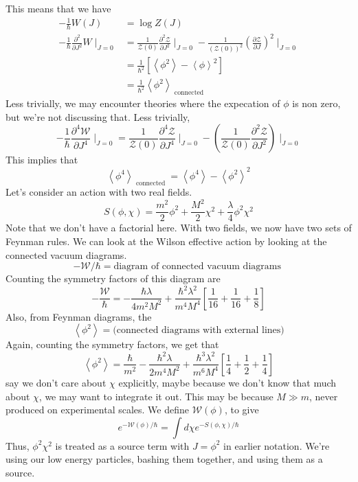 \documentclass[11pt, oneside]{article}   	%
\theoremstyle{slanted}
\begin{document}
This means that we have 
\begin{align*}
-\frac{1}{\hbar } W \left( J  \right)   &=  \log Z \left( J  \right)   \\ 
- \frac{1}{\hbar } \frac{\partial  ^ 2 }{\partial  J ^ 2 }  W \mid 
_{ J = 0 } &= \frac{1}{ \mathcal{ Z } \left( 0  \right)  } 
\frac{\partial  ^ 2 \mathcal{ Z } }{\partial  J ^ 2 }  \mid_{ J = 0 } 
- \frac{1}{\left( \mathcal{ Z } \left( 0  \right)   \right)  ^ 2 } 
\left( \frac{\partial  \mathcal{ Z } }{\partial  J }   \right)  ^ 2 \mid _{ J = 0 } \\
&=  \frac{1}{\hbar ^ 2 } \left[  
\left< \phi ^ 2  \right>  - \left< \phi  \right> ^ 2 \right]   \\
& = \frac{1}{\hbar^  2 } \left< \phi ^ 2  \right> _{ \text{ connected }}
\end{align*}
Less trivially, we may encounter theories where the expecation of 
$ \phi $ is non zero, but we're not discussing that. 
Less trivially, 
\[
- \frac{1}{\hbar } \frac{\partial  ^ 4 \mathcal{ W } }{\partial  J ^ 4 }  \mid_{ J = 0 } 
= \frac{1}{ \mathcal{ Z } \left(  0  \right)  } \frac{\partial  
^ 4 \mathcal{ Z } }{\partial  J ^ 4 }  \mid _{ J = 0 }  - 
\left( \frac{1}{ \mathcal{ Z } \left(  0   \right) } \frac{\partial  ^ 2  
\mathcal{ Z } }{\partial J ^ 2  }    \right)  \mid_{ J = 0 } 
\]   This implies that 
\[
\left< \phi ^ 4  \right>_{ \text{ connected } }  = \left< \phi ^ 4  \right>  - 
\left< \phi ^ 2  \right> ^ 2 
\]  
Let's consider an action 
with two real fields. 
\[
S \left( \phi , \chi  \right)  = \frac{m ^ 2 }{ 2 } \phi ^ 2 
+ \frac{ M ^ 2 }{ 2 } \chi ^2  + \frac{\lambda}{4 } \phi ^ 2 \chi ^ 2 
\] Note that we don't have a factorial here. 
With two fields, 
we now have two sets of Feynman rules. 
We can look at the 
Wilson effective action 
by looking at the connected vacuum diagrams. 
\[
- \mathcal{ W } / \hbar   = \text{diagram of connected vacuum diagrams }
\] Counting 
the symmetry factors of 
this diagram are 
\[
- \frac{\mathcal{ W } }{ \hbar }  = 
- \frac{\hbar \lambda }{ 4 m^ 2 M ^ 2 } + \frac{\hbar ^ 2 \lambda ^ 2 }{ 
m ^ 4 M ^ 4 } \left[  \frac{1}{16 } + \frac{1}{16 } + \frac{1}{8 } \right] 
\] Also, from 
Feynman diagrams, 
the 
\[
\left< \phi ^ 2  \right>    = \text{(connected diagrams with external lines)}
\] Again, counting the 
symmetry factors, we get that 
\[
\left< \phi ^ 2  \right>  = \frac{\hbar}{m ^ 2 }
- \frac{\hbar ^ 2 \lambda }{ 2 m ^ 4 M^ 2 } + \frac{\hbar ^ 3 \lambda ^ 2  }{ 
m ^ 6 M ^ 4 } \left[  \frac{1}{4  } + \frac{1}{2 } + \frac{1}{4 } \right] 
\] say we don't care about $ \chi $ 
explicitly,
maybe because we don't know that much about $ \chi $, 
we may want to integrate it out. 
This may be because $ M \gg  m $, never 
produced on experimental scales. 
We define $ \mathcal{ W } \left(  \phi  \right)  $, 
to give 
\[
e ^{  - \mathcal{  W } \left( \phi  \right)   / \hbar } 
= \int d \chi e ^{  - S \left( \phi , \chi  \right)   / \hbar }
\] Thus, $ \phi ^ 2 \chi ^ 2 $ is treated 
as a source term with $ J  = \phi ^ 2 $ in earlier 
notation. We're using our low energy 
particles, bashing them together, 
and using them as a source. 
\end{document}
